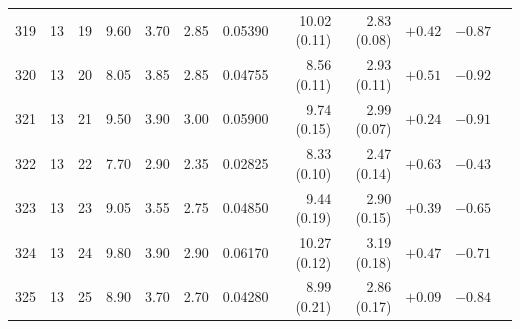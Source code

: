 \begin{longtable}{@{}rrrrrrrrrrrr@{}}
319 & 13 & 19 & \num{9.60} & \num{3.70} & \num{2.85} & \num{0.05390} & \num{10.02} (\num{0.11}) & \num{2.83} (\num{0.08}) & $+\num{0.42}$ & $-\num{0.87}$ &  \\
320 & 13 & 20 & \num{8.05} & \num{3.85} & \num{2.85} & \num{0.04755} & \num{8.56} (\num{0.11}) & \num{2.93} (\num{0.11}) & $+\num{0.51}$ & $-\num{0.92}$ &  \\
321 & 13 & 21 & \num{9.50} & \num{3.90} & \num{3.00} & \num{0.05900} & \num{9.74} (\num{0.15}) & \num{2.99} (\num{0.07}) & $+\num{0.24}$ & $-\num{0.91}$ &  \\
322 & 13 & 22 & \num{7.70} & \num{2.90} & \num{2.35} & \num{0.02825} & \num{8.33} (\num{0.10}) & \num{2.47} (\num{0.14}) & $+\num{0.63}$ & $-\num{0.43}$ &  \\
323 & 13 & 23 & \num{9.05} & \num{3.55} & \num{2.75} & \num{0.04850} & \num{9.44} (\num{0.19}) & \num{2.90} (\num{0.15}) & $+\num{0.39}$ & $-\num{0.65}$ &  \\
324 & 13 & 24 & \num{9.80} & \num{3.90} & \num{2.90} & \num{0.06170} & \num{10.27} (\num{0.12}) & \num{3.19} (\num{0.18}) & $+\num{0.47}$ & $-\num{0.71}$ &  \\
325 & 13 & 25 & \num{8.90} & \num{3.70} & \num{2.70} & \num{0.04280} & \num{8.99} (\num{0.21}) & \num{2.86} (\num{0.17}) & $+\num{0.09}$ & $-\num{0.84}$ &  \\
\end{longtable}
